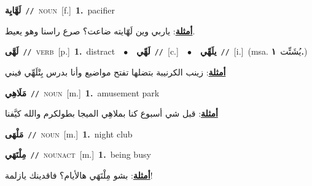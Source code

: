 \documentclass[10pt,a4paper,twoside]{article} %
\begin{document}
\begin{multicols}{2}
{\setlength\topsep{0pt}\textbf{\foreignlanguage{arabic}{لَهَّايِة}}\ {\color{gray}\texttt{//}\color{black}}\ \textsc{noun}\ [f.]\ \textbf{1.}~pacifier\  \begin{flushright}\color{gray}\foreignlanguage{arabic}{\textbf{\underline{\foreignlanguage{arabic}{أمثلة}}}: ياربي وين لَهّايته ضاعت؟ صرع راسنا وهو يعيط.}\end{flushright}\color{black}} \vspace{2mm}

{\setlength\topsep{0pt}\textbf{\foreignlanguage{arabic}{لَهَّى}}\ {\color{gray}\texttt{//}\color{black}}\ \textsc{verb}\ [p.]\ \textbf{1.}~distract\ \ $\bullet$\ \ \setlength\topsep{0pt}\textbf{\foreignlanguage{arabic}{لَهِّي}}\ {\color{gray}\texttt{//}\color{black}}\ [c.]\ \ $\bullet$\ \ \setlength\topsep{0pt}\textbf{\foreignlanguage{arabic}{يلَهِّي}}\ {\color{gray}\texttt{//}\color{black}}\ [i.]\ \color{gray}(msa. \foreignlanguage{arabic}{يُشَتِّت}~\foreignlanguage{arabic}{\textbf{١.}})\color{black}\  \begin{flushright}\color{gray}\foreignlanguage{arabic}{\textbf{\underline{\foreignlanguage{arabic}{أمثلة}}}: زينب الكرنيبة بتضلها تفتح مواضيع وأنا بدرس بِتْلَهِّي فيني}\end{flushright}\color{black}} \vspace{2mm}

{\setlength\topsep{0pt}\textbf{\foreignlanguage{arabic}{مَلَاهِي}}\ {\color{gray}\texttt{//}\color{black}}\ \textsc{noun}\ [m.]\ \textbf{1.}~amusement park\  \begin{flushright}\color{gray}\foreignlanguage{arabic}{\textbf{\underline{\foreignlanguage{arabic}{أمثلة}}}: قبل شي أسبوع كنا بملاهِي الميجا بطولكرم والله كيَّفنا}\end{flushright}\color{black}} \vspace{2mm}

{\setlength\topsep{0pt}\textbf{\foreignlanguage{arabic}{مَلْهَى}}\ {\color{gray}\texttt{//}\color{black}}\ \textsc{noun}\ [m.]\ \textbf{1.}~night club\ } \vspace{2mm}

{\setlength\topsep{0pt}\textbf{\foreignlanguage{arabic}{مِلْتَهَي}}\ {\color{gray}\texttt{//}\color{black}}\ \textsc{noun\textunderscore act}\ [m.]\ \textbf{1.}~being busy\  \begin{flushright}\color{gray}\foreignlanguage{arabic}{\textbf{\underline{\foreignlanguage{arabic}{أمثلة}}}: بشو مِلْتَهَي هالأيام؟ فاقدينك يازلمة!}\end{flushright}\color{black}} \vspace{2mm}


\end{multicols}
\end{document}
